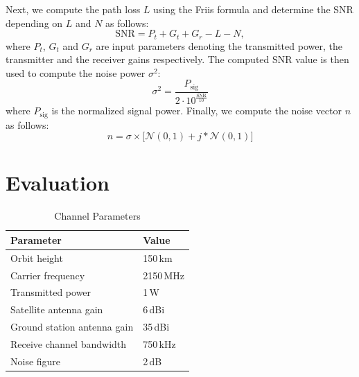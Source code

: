\documentclass[conference]{IEEEtran}
\begin{document}
Next, we compute the path loss $L$ using the Friis formula \cite{} and determine the SNR depending on $L$ and $N$ as follows:
%
\begin{equation}
  \mathrm{SNR} = P_t + G_t + G_r - L - N,
\end{equation}
%
where $P_t$, $G_t$ and $G_r$ are input parameters denoting the transmitted power, the transmitter and the receiver gains respectively. 
The computed $\mathrm{SNR}$ value is then used to compute the noise power $\sigma^2$:
%
\begin{equation}
  \sigma^2 = \frac{P_{\mathrm{sig}}}{2 \cdot 10^{\frac{\mathrm{SNR}}{10}}}
\end{equation}
%
where $P_{\mathrm{sig}}$ is the normalized signal power.
Finally, we compute the noise vector $n$ as follows:
%
\begin{equation}
  n = \sigma \times \bigl[\mathcal{N}(0,1) + j * \mathcal{N}(0,1) \bigr] 
\end{equation}
%


\section{Evaluation}
\label{sec:evaluation}

\begin{table}
  \caption{Channel Parameters}
  \label{tab:channel_parameters}

  \centering
	\begin{tabular}{ll}
		\toprule
    Parameter & Value \\
    \midrule
		Orbit height & 150\,km \\
		Carrier frequency & 2150\,MHz \\
    Transmitted power & 1\,W \\
    Satellite antenna gain & 6\,dBi \\
    Ground station antenna gain & 35\,dBi \\
		Receive channel bandwidth & 750\,kHz \\
		Noise figure & 2\,dB \\
		\bottomrule
	\end{tabular}
\end{table}

\end{document}
